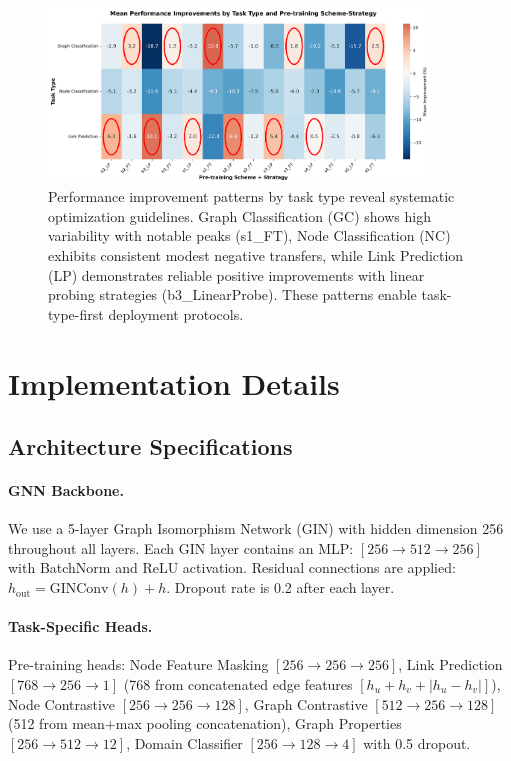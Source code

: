\documentclass[11pt]{article}
\begin{document}
\begin{figure}[!ht]
\centering
\includegraphics[width=0.9\textwidth]{task_type_performance_heatmap.png}
\caption{Performance improvement patterns by task type reveal systematic optimization guidelines. Graph Classification (GC) shows high variability with notable peaks (s1\_FT), Node Classification (NC) exhibits consistent modest negative transfers, while Link Prediction (LP) demonstrates reliable positive improvements with linear probing strategies (b3\_LinearProbe). These patterns enable task-type-first deployment protocols.}
\label{fig:task-heatmap}
\end{figure}

\clearpage

\appendix

\section{Implementation Details}

\subsection{Architecture Specifications}

\paragraph{GNN Backbone.} We use a 5-layer Graph Isomorphism Network (GIN) with hidden dimension 256 throughout all layers. Each GIN layer contains an MLP: $[256 \rightarrow 512 \rightarrow 256]$ with BatchNorm and ReLU activation. Residual connections are applied: $h_{\text{out}} = \text{GINConv}(h) + h$. Dropout rate is 0.2 after each layer.

\paragraph{Task-Specific Heads.} Pre-training heads: Node Feature Masking $[256 \rightarrow 256 \rightarrow 256]$, Link Prediction $[768 \rightarrow 256 \rightarrow 1]$ (768 from concatenated edge features $[h_u + h_v + |h_u - h_v|]$), Node Contrastive $[256 \rightarrow 256 \rightarrow 128]$, Graph Contrastive $[512 \rightarrow 256 \rightarrow 128]$ (512 from mean+max pooling concatenation), Graph Properties $[256 \rightarrow 512 \rightarrow 12]$, Domain Classifier $[256 \rightarrow 128 \rightarrow 4]$ with 0.5 dropout.
\end{document}
